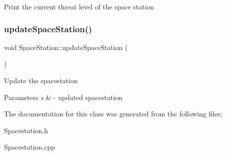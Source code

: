 Print the current threat level of the space station \mbox{\label{classSpaceStation_acebba61d05be13cd336785ba5ee0ece5}} 
\subsubsection{\texorpdfstring{update\+Space\+Station()}{updateSpaceStation()}}
{\footnotesize\ttfamily void Space\+Station\+::update\+Space\+Station (\begin{DoxyParamCaption}\item[{\hyperlink{classSpaceStation}{Space\+Station} $\ast$}]{ }\end{DoxyParamCaption})}

Update the spacestation 
\begin{DoxyParams}{Parameters}
{\em s} & -\/ updated spacestation \\
\hline
\end{DoxyParams}


The documentation for this class was generated from the following files\+:\begin{DoxyCompactItemize}
\item 
Spacestation.\+h\item 
Spacestation.\+cpp\end{DoxyCompactItemize}
